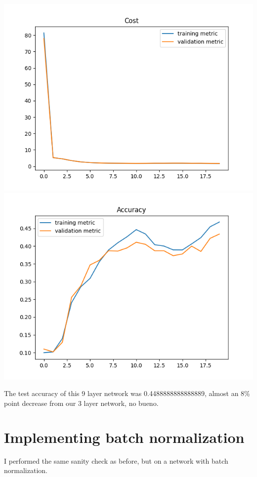 \documentclass[11pt,a4paper]{article}
\begin{document}
\includegraphics[width=\textwidth]{cost_k=9.png}
\includegraphics[width=\textwidth]{accuracy_k=9.png}

The test accuracy of this 9 layer network was 0.4488888888888889, almost an 8\% point decrease from our 3 layer network, no bueno.

\section{Implementing batch normalization}

I performed the same sanity check as before, but on a network with batch normalization.
\end{document}
